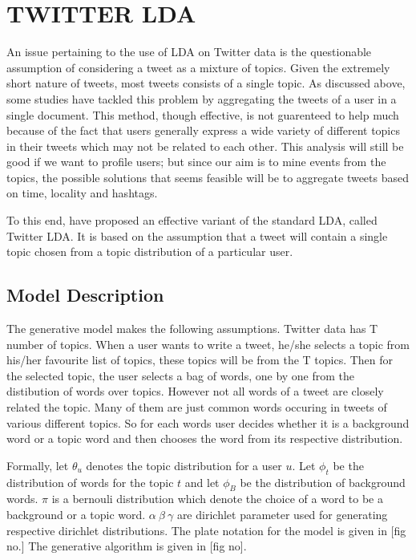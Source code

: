 \section{\uppercase{Twitter LDA}}
An issue pertaining to the use of LDA on Twitter data is the questionable assumption of considering a tweet as a mixture of topics. Given the extremely short nature of tweets, most tweets consists of a single topic. As discussed above, some studies have tackled this problem by aggregating the tweets of a user in a single document. This method, though effective, is not guarenteed to help much because of the fact that users generally express a wide variety of different topics in their tweets which may not be related to each other. This analysis will still be good if we want to profile users; but since our aim is to mine events from the topics, the possible solutions that seems feasible will be to aggregate tweets based on time, locality and hashtags.

To this end, \cite{zhao2011comparing} have proposed an effective variant of the standard LDA, called Twitter LDA. It is based on the assumption that a tweet will contain a single topic chosen from a topic distribution of a particular user. 

\subsection{Model Description} 
The generative model makes the following assumptions. Twitter data has T number of topics. When a user wants to write a tweet, he/she selects a topic from his/her favourite list of topics, these topics will be from the T topics. Then for the selected topic, the user selects a bag of words, one by one from the distibution of words over topics. However not all words of a tweet are closely related the topic. Many of them are just common words occuring in tweets of various different topics. So for each words user decides whether it is a background word or a topic word and then chooses the word from its respective distribution.

Formally, let $\theta_u$ denotes the topic distribution for a user $u$. Let $\phi_t$ be the distribution of words for the topic $t$ and let $\phi_B$ be the distribution of background words. $\pi$ is a bernouli distribution which denote the choice of a word to be a background or a topic word. $\alpha~\beta~\gamma$ are dirichlet parameter used for generating respective dirichlet distributions. The plate notation for the model is given in [fig no.] The generative algorithm is given in [fig no].